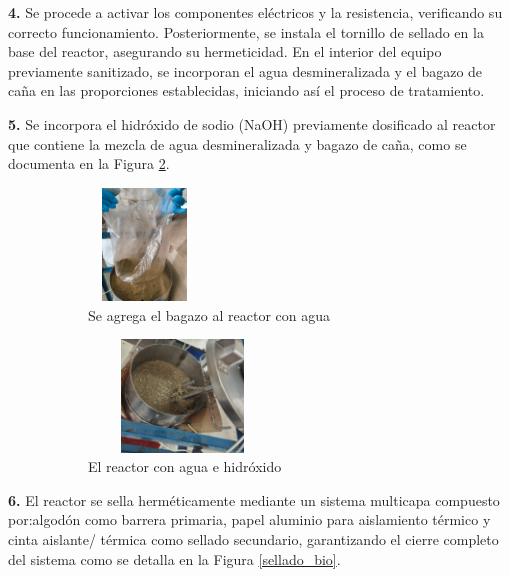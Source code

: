 \documentclass[12pt]{article}
\begin{document}
			\textbf{4.} Se procede a activar los componentes eléctricos y la resistencia, verificando su correcto funcionamiento. Posteriormente, se instala el tornillo de sellado en la base del reactor, asegurando su hermeticidad. En el interior del equipo previamente sanitizado, se incorporan el agua desmineralizada y el bagazo de caña en las proporciones establecidas, iniciando así el proceso de tratamiento. 
			
			\textbf{5.} Se incorpora el hidróxido de sodio (NaOH) previamente dosificado al reactor que contiene la mezcla de agua desmineralizada y bagazo de caña,  como se documenta en la Figura \ref{bagazo con hidroxido}.
		
			
			
			\begin{figure} [H]
				\centering
				\begin{subfigure}[b]{0.45\textwidth}
					\centering
					\includegraphics[width=3cm, height=3cm]{imagenes/agua con bagazo}
					\caption{Se agrega el bagazo al reactor con agua}
					\label{agua con bagazo}
				\end{subfigure}
				\hfill %
				\begin{subfigure}[b]{0.45\textwidth}
					\centering
					\includegraphics[width=5cm, height=3cm]{imagenes/bagazo con hidroxido1}
					\caption{El reactor con agua e hidróxido}
					\label{bagazo con hidroxido}
				\end{subfigure}
				\caption{}
				\label{fig:ef}
			\end{figure}
			
			
			\textbf{6.} El reactor se sella herméticamente mediante un sistema multicapa compuesto por:algodón como barrera primaria, papel aluminio para aislamiento térmico y cinta aislante/ térmica como sellado secundario, garantizando el cierre completo del sistema como se detalla en la Figura \ref{sellado_bio}.
			
\end{document}
